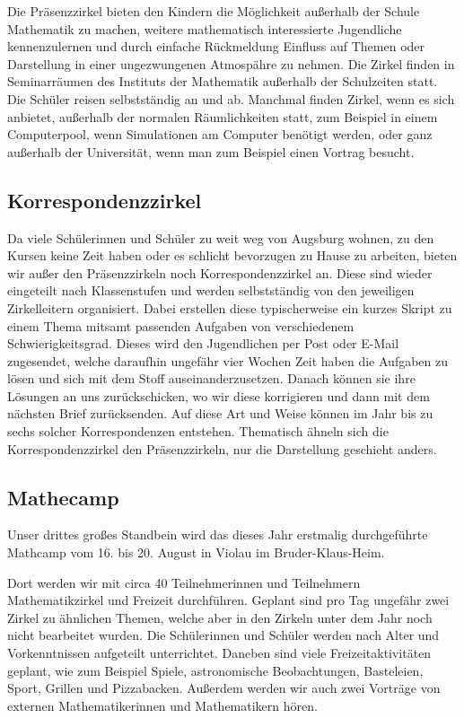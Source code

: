 \documentclass[12pt]{zettel}
\begin{document}
Die Präsenzzirkel bieten den Kindern die Möglichkeit außerhalb der
Schule Mathematik zu machen, weitere mathematisch interessierte
Jugendliche kennenzulernen und durch einfache Rückmeldung Einfluss auf
Themen oder Darstellung in einer ungezwungenen Atmospähre zu nehmen. Die
Zirkel finden in Seminarräumen des Instituts der Mathematik außerhalb
der Schulzeiten statt. Die Schüler reisen selbstständig an und ab.
Manchmal finden Zirkel, wenn es sich anbietet, außerhalb der normalen
Räumlichkeiten statt, zum Beispiel in einem Computerpool, wenn
Simulationen am Computer benötigt werden, oder ganz außerhalb der
Universität, wenn man zum Beispiel einen Vortrag besucht.

\subsection{Korrespondenzzirkel}

Da viele Schülerinnen und Schüler zu weit weg von Augsburg wohnen, zu
den Kursen keine Zeit haben oder es schlicht bevorzugen zu Hause zu
arbeiten, bieten wir außer den Präsenzzirkeln noch Korrespondenzzirkel
an. Diese sind wieder eingeteilt nach Klassenstufen und werden
selbstständig von den jeweiligen Zirkelleitern organisiert. Dabei
erstellen diese typischerweise ein kurzes Skript zu einem Thema mitsamt
passenden Aufgaben von verschiedenem Schwierigkeitsgrad. Dieses wird den
Jugendlichen per Post oder E-Mail zugesendet, welche daraufhin ungefähr
vier Wochen Zeit haben die Aufgaben zu lösen und sich mit dem Stoff
auseinanderzusetzen. Danach können sie ihre Lösungen an uns
zurückschicken, wo wir diese korrigieren und dann mit dem nächsten Brief
zurücksenden. Auf diese Art und Weise können im Jahr bis zu sechs
solcher Korrespondenzen entstehen. Thematisch ähneln sich die
Korrespondenzzirkel den Präsenzzirkeln, nur die Darstellung geschieht
anders.

\subsection{Mathecamp}

Unser drittes großes Standbein wird das dieses Jahr erstmalig
durchgeführte Mathcamp vom 16. bis 20. August in Violau im
Bruder-Klaus-Heim.

Dort werden wir mit circa 40 Teilnehmerinnen und Teilnehmern
Mathematikzirkel und Freizeit durchführen. Geplant sind pro Tag ungefähr
zwei Zirkel zu ähnlichen Themen, welche aber in den Zirkeln unter dem
Jahr noch nicht bearbeitet wurden. Die Schülerinnen und Schüler werden
nach Alter und Vorkenntnissen aufgeteilt unterrichtet. Daneben sind
viele Freizeitaktivitäten geplant, wie zum Beispiel Spiele,
astronomische Beobachtungen, Basteleien, Sport, Grillen und Pizzabacken.
Außerdem werden wir auch zwei Vorträge von externen Mathematikerinnen
und Mathematikern hören.
\end{document}
